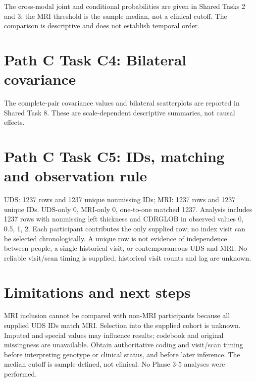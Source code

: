 \documentclass[11pt]{article}
\begin{document}
The cross-modal joint and conditional probabilities are given in Shared Tasks 2 and 3; the MRI threshold is the sample median, not a clinical cutoff. The comparison is descriptive and does not establish temporal order.

\section*{Path C Task C4: Bilateral covariance}

The complete-pair covariance values and bilateral scatterplots are reported in Shared Task 8. These are scale-dependent descriptive summaries, not causal effects.

\section*{Path C Task C5: IDs, matching and observation rule}

UDS: 1237 rows and 1237 unique nonmissing IDs; MRI: 1237 rows and 1237 unique IDs. UDS-only 0, MRI-only 0, one-to-one matched 1237. Analysis includes 1237 rows with nonmissing left thickness and CDRGLOB in observed values 0, 0.5, 1, 2. Each participant contributes the only supplied row; no index visit can be selected chronologically. A unique row is not evidence of independence between people, a single historical visit, or contemporaneous UDS and MRI. No reliable visit/scan timing is supplied; historical visit counts and lag are unknown.

\section*{Limitations and next steps}

MRI inclusion cannot be compared with non-MRI participants because all supplied UDS IDs match MRI. Selection into the supplied cohort is unknown. Imputed and special values may influence results; codebook and original missingness are unavailable. Obtain authoritative coding and visit/scan timing before interpreting genotype or clinical status, and before later inference. The median cutoff is sample-defined, not clinical. No Phase 3-5 analyses were performed.
\end{document}

